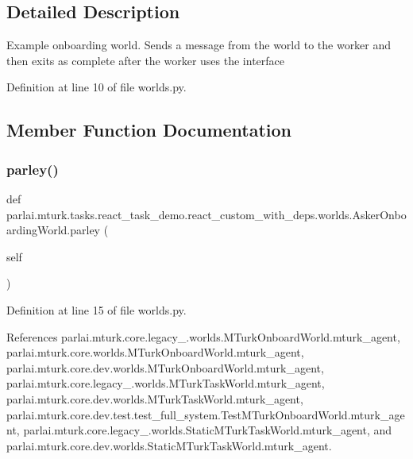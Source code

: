 \subsection{Detailed Description}
\begin{DoxyVerb}Example onboarding world. Sends a message from the world to the
worker and then exits as complete after the worker uses the interface
\end{DoxyVerb}
 

Definition at line 10 of file worlds.\+py.



\subsection{Member Function Documentation}
\mbox{\label{classparlai_1_1mturk_1_1tasks_1_1react__task__demo_1_1react__custom__with__deps_1_1worlds_1_1AskerOnboardingWorld_a96305c83fbb8cdfd739ed15291523cd5}} 
\subsubsection{\texorpdfstring{parley()}{parley()}}
{\footnotesize\ttfamily def parlai.\+mturk.\+tasks.\+react\+\_\+task\+\_\+demo.\+react\+\_\+custom\+\_\+with\+\_\+deps.\+worlds.\+Asker\+Onboarding\+World.\+parley (\begin{DoxyParamCaption}\item[{}]{self }\end{DoxyParamCaption})}



Definition at line 15 of file worlds.\+py.



References parlai.\+mturk.\+core.\+legacy\+\_.\+worlds.\+M\+Turk\+Onboard\+World.\+mturk\+\_\+agent, parlai.\+mturk.\+core.\+worlds.\+M\+Turk\+Onboard\+World.\+mturk\+\_\+agent, parlai.\+mturk.\+core.\+dev.\+worlds.\+M\+Turk\+Onboard\+World.\+mturk\+\_\+agent, parlai.\+mturk.\+core.\+legacy\+\_.\+worlds.\+M\+Turk\+Task\+World.\+mturk\+\_\+agent, parlai.\+mturk.\+core.\+dev.\+worlds.\+M\+Turk\+Task\+World.\+mturk\+\_\+agent, parlai.\+mturk.\+core.\+dev.\+test.\+test\+\_\+full\+\_\+system.\+Test\+M\+Turk\+Onboard\+World.\+mturk\+\_\+agent, parlai.\+mturk.\+core.\+legacy\+\_.\+worlds.\+Static\+M\+Turk\+Task\+World.\+mturk\+\_\+agent, and parlai.\+mturk.\+core.\+dev.\+worlds.\+Static\+M\+Turk\+Task\+World.\+mturk\+\_\+agent.



